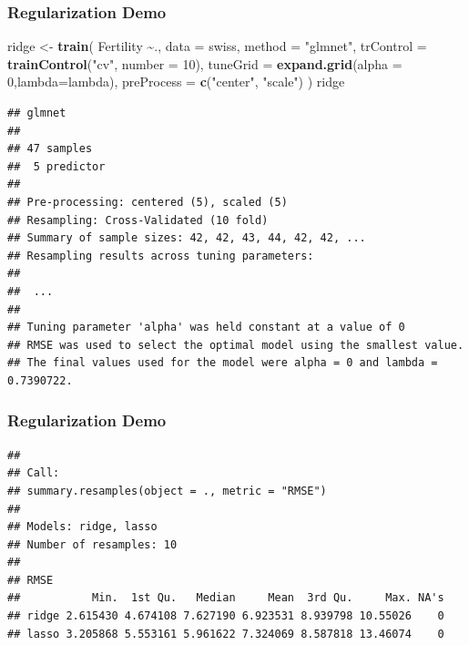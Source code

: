 \documentclass[
  shownotes,
  xcolor={svgnames},
  hyperref={colorlinks,citecolor=DarkBlue,linkcolor=DarkRed,urlcolor=DarkBlue}
  , aspectratio=169]{beamer}
\newenvironment{Shaded}{\begin{snugshade}}{\end{snugshade}}
\newcommand{\DataTypeTok}[1]{\textcolor[rgb]{0.13,0.29,0.53}{#1}}
\newcommand{\DecValTok}[1]{\textcolor[rgb]{0.00,0.00,0.81}{#1}}
\newcommand{\KeywordTok}[1]{\textcolor[rgb]{0.13,0.29,0.53}{\textbf{#1}}}
\newcommand{\NormalTok}[1]{#1}
\newcommand{\OperatorTok}[1]{\textcolor[rgb]{0.81,0.36,0.00}{\textbf{#1}}}
\newcommand{\StringTok}[1]{\textcolor[rgb]{0.31,0.60,0.02}{#1}}
\begin{document}
\begin{frame}[fragile]
\frametitle{Regularization Demo}

\begin{scriptsize}


\begin{Shaded}
\begin{Highlighting}[]
\NormalTok{ridge \textless{}{-}}\StringTok{ }\KeywordTok{train}\NormalTok{(}
\NormalTok{  Fertility }\OperatorTok{\textasciitilde{}}\NormalTok{., }\DataTypeTok{data =}\NormalTok{ swiss, }\DataTypeTok{method =} \StringTok{"glmnet"}\NormalTok{,}
  \DataTypeTok{trControl =} \KeywordTok{trainControl}\NormalTok{(}\StringTok{"cv"}\NormalTok{, }\DataTypeTok{number =} \DecValTok{10}\NormalTok{),}
  \DataTypeTok{tuneGrid =} \KeywordTok{expand.grid}\NormalTok{(}\DataTypeTok{alpha =} \DecValTok{0}\NormalTok{,}\DataTypeTok{lambda=}\NormalTok{lambda), }\DataTypeTok{preProcess =} \KeywordTok{c}\NormalTok{(}\StringTok{"center"}\NormalTok{, }\StringTok{"scale"}\NormalTok{)}
\NormalTok{  )}
\NormalTok{ridge}
\end{Highlighting}
\end{Shaded}
\end{scriptsize}
\begin{tiny}
\begin{verbatim}
## glmnet 
## 
## 47 samples
##  5 predictor
## 
## Pre-processing: centered (5), scaled (5) 
## Resampling: Cross-Validated (10 fold) 
## Summary of sample sizes: 42, 42, 43, 44, 42, 42, ... 
## Resampling results across tuning parameters:
## 
##  ...
## 
## Tuning parameter 'alpha' was held constant at a value of 0
## RMSE was used to select the optimal model using the smallest value.
## The final values used for the model were alpha = 0 and lambda = 0.7390722.
\end{verbatim}
\end{tiny}
\end{frame}
\begin{frame}[fragile]
\frametitle{Regularization Demo}




\begin{verbatim}
## 
## Call:
## summary.resamples(object = ., metric = "RMSE")
## 
## Models: ridge, lasso 
## Number of resamples: 10 
## 
## RMSE 
##           Min.  1st Qu.   Median     Mean  3rd Qu.     Max. NA's
## ridge 2.615430 4.674108 7.627190 6.923531 8.939798 10.55026    0
## lasso 3.205868 5.553161 5.961622 7.324069 8.587818 13.46074    0
\end{verbatim}

\end{frame}

\end{document}
